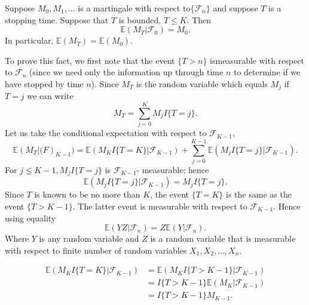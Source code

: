 \documentclass[a4paper,english,12pt]{article}
\begin{document}
\begin{thm} Suppose $M_0,M_1,\dots $ is a martingale with respect to$\{\mathcal{F}_n\}$ and suppose $T$ is a stopping time. Suppose that $T$ is bounded, $T\leq K$. Then
\begin{equation*}
\mathbb{E}(M_T|\mathcal{F}_0)=M_0.
\end{equation*}
In particular, $\mathbb{E}(M_T)=\mathbb{E}(M_0)$.
 \end{thm}
To prove this fact, we first note that the event $\{T>n\}$ ismeasurable with respect to $\mathcal{F}_n$ (since we need only the information up through time $n$ to determine if we have stopped by time $n$). Since $M_T$ is the random variable which equals $M_j$ if $T=j$ we can write
\begin{equation*}
M_T = \sum_{j=0}^K M_j I\{T=j\}.
\end{equation*}
Let us take the conditional expectation with respect to $\mathcal{F}_{K-1}$,
\begin{equation*}
\mathbb{E}(M_T|\mathcal(F)_{K-1})=\mathbb{E}(M_KI\{T=K\}|\mathcal{F}_{K-1})+\sum_{j=0}^{K-1} \mathbb{E}(M_jI\{T=j\}|\mathcal{F}_{K-1}).
\end{equation*}
For $j\leq K-1, M_jI\{T=j\}$ is $\mathcal{F}_{K-1}$- measurable; hence
\begin{equation*}
\mathbb{E}(M_jI\{T=j\}|\mathcal{F}_{K-1})=M_jI\{T=j\}.
\end{equation*}
Since $T$ is known to be no more than $K$, the event $\{T=K\}$ is the same as the event $\{T>K-1\}$. The latter event is measurable with respect to $\mathcal{F}_{K-1}$. Hence using equality
\begin{equation*}
\mathbb{E}(YZ|\mathcal{F}_n)= Z\mathbb{E}(Y|\mathcal{F}_n).
\end{equation*}
Where $Y$ is any random variable and $Z$ is a random variable that is measurable with respect to finite number of random variables $X_1,X_2,\dots,X_n$.

\begin{align*}
\mathbb{E}(M_KI\{T=K\}|\mathcal{F}_{K-1}) &=\mathbb{E}(M_KI\{T>K-1\}|\mathcal{F}_{K-1})\\
								   &=I\{T>K-1\}\mathbb{E}(M_K|\mathcal{F}_{K-1})\\
								   &=I\{T>K-1\}M_{K-1}.
\end{align*}
\end{document}

